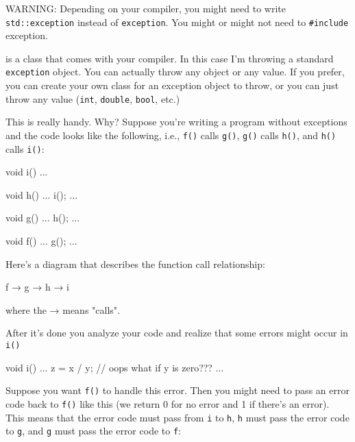 WARNING: Depending on your compiler, you might need to write
\texttt{std::exception} instead of \texttt{exception}. You might or might
not need to \texttt{\#include} exception.

\texttt{} is a class that comes with your compiler. In this case I'm throwing a standard \texttt{exception} object. You can actually throw any object or any value. If you prefer, you can create your own class for an exception object to throw, or you can just throw any value (\texttt{int}, \texttt{double}, \texttt{bool}, etc.)

This is really handy. Why? Suppose you're writing a program without exceptions and the code looks like the following, i.e., \texttt{f()} calls \texttt{g()}, \texttt{g()} calls \texttt{h()}, and \texttt{h()} calls \texttt{i()}:

\begin{console}
void i()
{    
     ...
}

void h()
{    
     ...
     i();
     ...
}

void g()
{    
     ...
     h();
     ...
}

void f()
{    
     ...
     g();
     ...
}
\end{console}

Here's a diagram that describes the function call
relationship:
\begin{console}
f → g → h → i
\end{console}
where the → means "calls".

After it's done you analyze your code and realize that
some errors might occur in \texttt{i()}

\begin{console}
void i()
{    
     ...
     z = x / y; // oops what if y is zero???
     ...
}
\end{console}

Suppose you want \texttt{f()} to handle this error. Then you might need to
pass an error code back to \texttt{f()} like this (we return 0 for no
error and 1 if there's an error). This means that the
error code must pass from \texttt{i} to \texttt{h}, \texttt{h} must pass the
error code to \texttt{g}, and \texttt{g} must pass the error code to
\texttt{f}:

